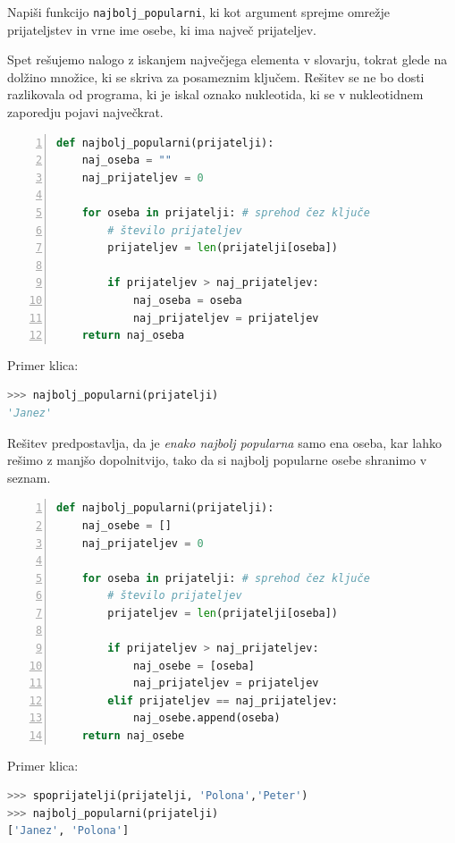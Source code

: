 \begin{zgled}
Napiši funkcijo \texttt{najbolj\_popularni}, ki kot argument sprejme omrežje prijateljstev in vrne ime osebe, ki ima največ prijateljev.
\end{zgled}
\begin{resitev}
Spet rešujemo nalogo z iskanjem največjega elementa v slovarju, tokrat glede na dolžino množice, ki se skriva za posameznim ključem. Rešitev se ne bo dosti razlikovala od programa, ki je iskal oznako nukleotida, ki se v nukleotidnem zaporedju pojavi največkrat.
\begin{lstlisting}[language=Python,numbers=left]
def najbolj_popularni(prijatelji):
    naj_oseba = ""
    naj_prijateljev = 0
    
    for oseba in prijatelji: # sprehod čez ključe
        # število prijateljev
        prijateljev = len(prijatelji[oseba])
        
        if prijateljev > naj_prijateljev:
            naj_oseba = oseba
            naj_prijateljev = prijateljev
    return naj_oseba
\end{lstlisting}
Primer klica:
\begin{lstlisting}[language=Python]
>>> najbolj_popularni(prijatelji)
'Janez'
\end{lstlisting}

Rešitev predpostavlja, da je \emph{enako najbolj popularna} samo ena oseba, kar lahko rešimo z manjšo dopolnitvijo, tako da si najbolj popularne osebe shranimo v seznam. 
\begin{lstlisting}[language=Python,numbers=left]
def najbolj_popularni(prijatelji):
    naj_osebe = []
    naj_prijateljev = 0
    
    for oseba in prijatelji: # sprehod čez ključe
        # število prijateljev
        prijateljev = len(prijatelji[oseba]) 
        
        if prijateljev > naj_prijateljev:
            naj_osebe = [oseba]
            naj_prijateljev = prijateljev
        elif prijateljev == naj_prijateljev:
            naj_osebe.append(oseba)
    return naj_osebe
\end{lstlisting}
Primer klica:
\begin{lstlisting}[language=Python]
>>> spoprijatelji(prijatelji, 'Polona','Peter')
>>> najbolj_popularni(prijatelji)
['Janez', 'Polona']
\end{lstlisting}
\end{resitev}

